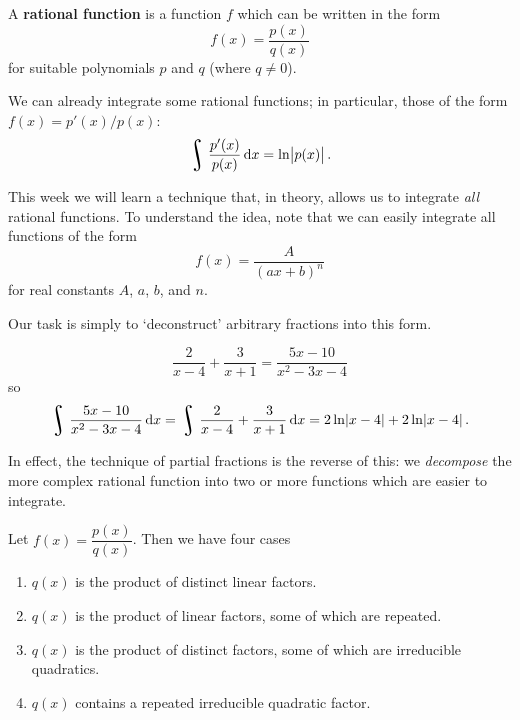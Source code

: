 



\begin{defn}
  A \textbf{rational function} is a function $ f $ which can be written in the form
  \begin{displaymath}
    f(x) = \dfrac{p(x)}{q(x)}
  \end{displaymath}
  for suitable polynomials $ p $ and $ q $ (where $ q \neq 0 $).
\end{defn}

We can already integrate some rational functions; in particular, those of the form $ f(x) = p'(x)/p(x) $:
\begin{displaymath}
  \rint \dfrac{p'(x)}{p(x)} \dif{x} = \ln\abs{p(x)}.
\end{displaymath}

This week we will learn a technique that, in theory, allows us to integrate \textit{all} rational functions. To understand
the idea, note that we can easily integrate all functions of the form
\begin{displaymath}
  f(x) = \dfrac{A}{(ax + b)^n}
\end{displaymath}
for real constants $ A $, $ a $, $ b $, and $ n $.

Our task is simply to `deconstruct' arbitrary fractions into this form.
\begin{ex}
  \begin{displaymath}
    \dfrac{2}{x-4} + \dfrac{3}{x + 1} = \dfrac{5x - 10}{x^2 - 3x - 4}
  \end{displaymath}
  so
  \begin{displaymath}
    \rint \dfrac{5x - 10}{x^2 - 3x - 4} \dif{x} = \rint \dfrac{2}{x-4} + \dfrac{3}{x + 1} \dif{x} = 2\ln\abs{x-4} + 2\ln\abs{x-4}.
  \end{displaymath}
\end{ex}

In effect, the technique of partial fractions is the reverse of this: we \emph{decompose} the more
complex rational function into two or more functions which are easier to integrate.

Let $ f(x) = \dfrac{p(x)}{q(x)} $. Then we have four cases
\begin{enumerate}
  \item $ q(x) $ is the product of distinct linear factors.
  \item $ q(x) $ is the product of linear factors, some of which are repeated.
  \item $ q(x) $ is the product of distinct factors, some of which are irreducible quadratics.
  \item $ q(x) $ contains a repeated irreducible quadratic factor.
\end{enumerate}

